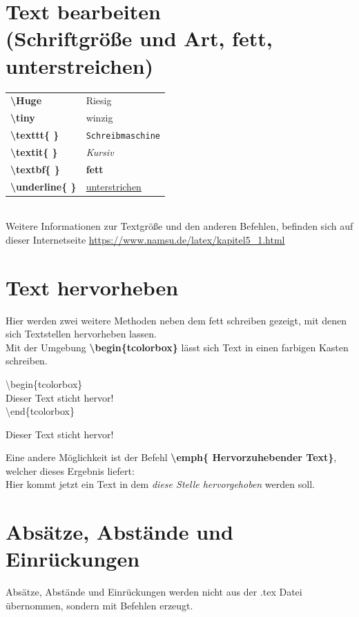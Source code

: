 \documentclass[a4paper, 12pt]{scrreprt}
\begin{document}
\section{Text bearbeiten \\(Schriftgröße und Art, fett, unterstreichen)}
\begin{tabular}{ll}
\textbf{\textbackslash Huge} & {\huge Riesig}\\
\textbf{\textbackslash tiny} & {\tiny winzig}\\
\textbf{\textbackslash texttt\{ \}} & \texttt{Schreibmaschine}\\
\textbf{\textbackslash textit\{ \}} & \textit{Kursiv}\\
\textbf{\textbackslash textbf\{ \}} & \textbf{fett}\\
\textbf{\textbackslash underline\{ \}} & \underline{unterstrichen}\\
\end{tabular}\hfill\\
Weitere Informationen zur Textgröße und den anderen Befehlen,  befinden sich auf dieser Internetseite \href{https://www.namsu.de/latex/kapitel5_1.html}{https://www.namsu.de/latex/kapitel5\_1.html}

\section{Text hervorheben}
Hier werden zwei weitere Methoden neben dem fett schreiben gezeigt, mit denen sich Textstellen hervorheben lassen.\\
Mit der Umgebung \textbf{\textbackslash begin\{tcolorbox\}} lässt sich Text in einen farbigen Kasten schreiben.
\begin{addmargin}{0.5cm}
\textbackslash begin\{tcolorbox\}\\
Dieser Text sticht hervor!\\
\textbackslash end\{tcolorbox\}\\
\end{addmargin}
\begin{tcolorbox}
Dieser Text sticht hervor!
\end{tcolorbox}
Eine andere Möglichkeit ist der Befehl \textbf{\textbackslash emph\{ Hervorzuhebender Text\}}, welcher dieses Ergebnis liefert:\\
\hspace*{0.5cm}Hier kommt jetzt ein Text in dem \emph{diese Stelle hervorgehoben} werden soll.

\section{Absätze, Abstände und Einrückungen}
Absätze, Abstände und Einrückungen werden nicht aus der .tex Datei übernommen, sondern mit Befehlen erzeugt.
\end{document}
